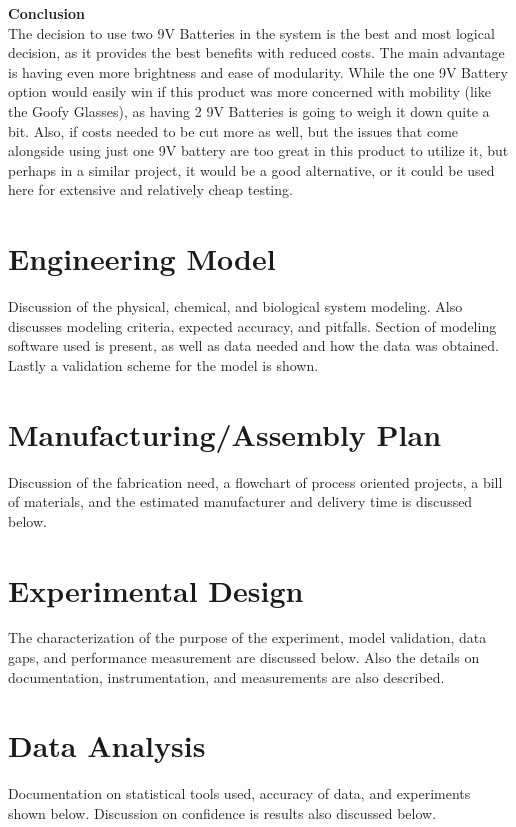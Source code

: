\documentclass[12pt]{article}
\begin{document}
					\noindent\textbf{Conclusion}\\
					\indent The decision to use two 9V Batteries in the system is the best and most logical decision, as it provides the best benefits with reduced costs. The main advantage is having even more brightness and ease of modularity. While the one 9V Battery option would easily win if this product was more concerned with mobility (like the Goofy Glasses), as having 2 9V Batteries is going to weigh it down quite a bit. Also, if costs needed to be cut more as well, but the issues that come alongside using just one 9V battery are too great in this product to utilize it, but perhaps in a similar project, it would be a good alternative, or it could be used here for extensive and relatively cheap testing.
				
	\newpage
	
	\section{Engineering Model}
	Discussion of the physical, chemical, and biological system modeling. Also discusses modeling criteria, expected accuracy, and pitfalls. Section of modeling software used is present, as well as data needed and how the data was obtained. Lastly a validation scheme for the model is shown.
	
	\newpage
	
	\section{Manufacturing/Assembly Plan}
	Discussion of the fabrication need, a flowchart of process oriented projects, a bill of materials, and the estimated manufacturer and delivery time is discussed below.
	
	\newpage
	
	\section{Experimental Design}
	The characterization of the purpose of the experiment, model validation, data gaps, and performance measurement are discussed below. Also the details on documentation, instrumentation, and measurements are also described.
		
	\newpage	
	
	\section{Data Analysis}
	Documentation on statistical tools used, accuracy of data, and experiments shown below. Discussion on confidence is results also discussed below.
		
\end{document}
